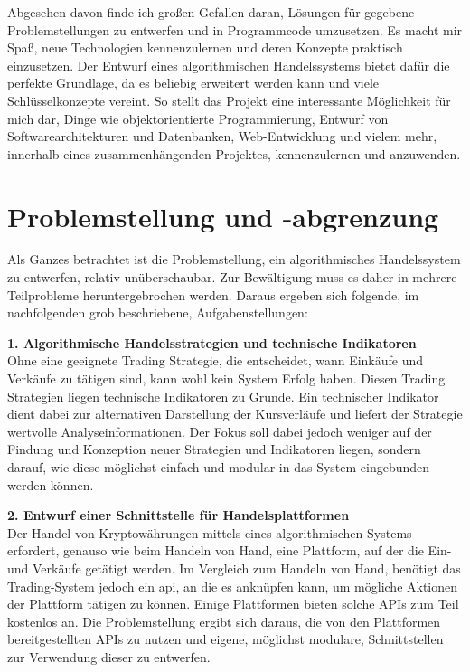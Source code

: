 \documentclass[oneside]{ausarbeitung}
\begin{document}
Abgesehen davon finde ich großen Gefallen daran, Lösungen für
gegebene Problemstellungen zu entwerfen und in Programmcode
umzusetzen. Es macht mir Spaß, neue Technologien kennenzulernen und
deren Konzepte praktisch einzusetzen. Der Entwurf eines
algorithmischen Handelssystems bietet dafür die perfekte Grundlage,
da es beliebig erweitert werden kann und viele Schlüsselkonzepte
vereint. So stellt das Projekt eine interessante Möglichkeit für
mich dar, Dinge wie objektorientierte Programmierung, Entwurf von
Softwarearchitekturen und Datenbanken, Web-Entwicklung und vielem
mehr, innerhalb eines zusammenhängenden Projektes, kennenzulernen und
anzuwenden.


\section{Problemstellung und -abgrenzung}
\label{sec:problemstellung}

Als Ganzes betrachtet ist die Problemstellung, ein algorithmisches
Handelssystem zu entwerfen, relativ unüberschaubar. Zur Bewältigung
muss es daher in mehrere Teilprobleme heruntergebrochen werden. Daraus
ergeben sich folgende, im nachfolgenden grob beschriebene,
Aufgabenstellungen:

\textbf{1. Algorithmische Handelsstrategien und technische Indikatoren} \\
Ohne eine geeignete Trading Strategie, die entscheidet, wann Einkäufe
und Verkäufe zu tätigen sind, kann wohl kein System Erfolg haben.
Diesen Trading Strategien liegen technische Indikatoren zu Grunde. Ein
technischer Indikator dient dabei zur alternativen Darstellung der
Kursverläufe und liefert der Strategie wertvolle Analyseinformationen.
Der Fokus soll dabei jedoch weniger auf der Findung und Konzeption
neuer Strategien und Indikatoren liegen, sondern darauf, wie diese
möglichst einfach und modular in das System eingebunden werden
können.

\textbf{2. Entwurf einer Schnittstelle für Handelsplattformen} \\
Der Handel von Kryptowährungen mittels eines algorithmischen Systems
erfordert, genauso wie beim Handeln von Hand, eine Plattform, auf der
die Ein- und Verkäufe getätigt werden. Im Vergleich zum Handeln von
Hand, benötigt das Trading-System jedoch ein \ac{api}, an die es
anknüpfen kann, um mögliche Aktionen der Plattform tätigen zu
können. Einige Plattformen bieten solche APIs zum Teil kostenlos an.
Die Problemstellung ergibt sich daraus, die von den Plattformen
bereitgestellten APIs zu nutzen und eigene, möglichst modulare,
Schnittstellen zur Verwendung dieser zu entwerfen.
\end{document}
